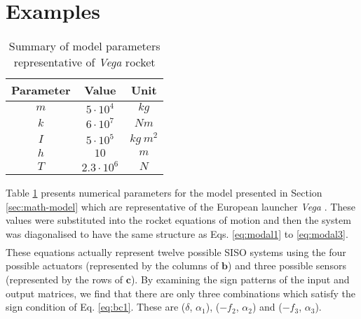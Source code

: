 \documentclass{mbd_fullpaper}
\begin{document}
\section{Examples}
\label{sec:num-examples}
\begin{table}[!ht]
  \begin{center}
    \caption{Summary of model parameters representative of \emph{Vega} rocket \label{tab:modelparam}}
    \vspace{1mm}
    \begin{tabular}{ ccc }
	\hline
           Parameter & Value & Unit \\
	\hline
      	$m$ & $5 \cdot 10^4$ & $kg$\\
      	$k$ & $6 \cdot 10^7$ & $Nm$\\
      	$I$ & $5 \cdot 10^5$ & $kg~m^2$\\
      	$h$ & $10$ & $m$\\
      	$T$ & $2.3 \cdot 10^6$ & $N$\\
    \end{tabular}
  \end{center}
\end{table}
Table \ref{tab:modelparam} presents numerical parameters for the model presented in Section \ref{sec:math-model} which are representative of the European launcher \emph{Vega} \cite{Perez2006}.
These values were substituted into the rocket equations of motion and then the system was diagonalised to have the same structure as Eqs. \ref{eq:modal1} to \ref{eq:modal3}.
%
\begin{multline}

\label{eq:num_rock1}
\end{multline}
\begin{equation}

\label{eq:num_rock2}
\end{equation}
%
These equations actually represent twelve possible SISO systems using the four possible actuators (represented by the columns of $\mathbf{b}$) and three possible sensors (represented by the rows of $\mathbf{c}$).
By examining the sign patterns of the input and output matrices, we find that there are only three combinations which satisfy the sign condition of Eq. \ref{eq:bc1}.
These are ($\delta$, $\alpha_1$), ($-f_2$, $\alpha_2$) and ($-f_3$, $\alpha_3$).
\end{document}
